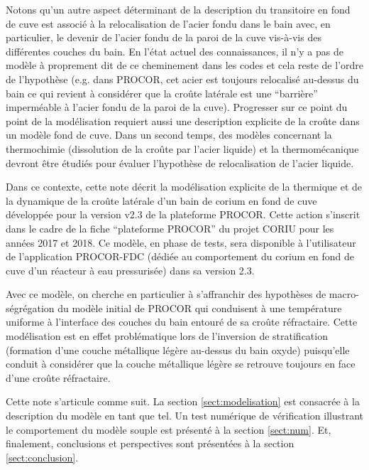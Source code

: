 \begin{remark}
Notons qu'un autre aspect déterminant de la description du transitoire en fond de cuve est associé à la relocalisation de l'acier fondu dans le bain avec, en particulier, le devenir de l'acier fondu de la paroi de la cuve vis-à-vis des différentes couches du bain. En l'état actuel des connaissances, il n'y a pas de modèle à proprement dit de ce cheminement dans les codes et cela reste de l'ordre de l'hypothèse (e.g. dans PROCOR, cet acier est toujours relocalisé au-dessus du bain ce qui revient à considérer que la croûte latérale est une ``barrière'' imperméable à l'acier fondu de la paroi de la cuve). Progresser sur ce point du point de la modélisation requiert aussi une description explicite de la croûte dans un modèle fond de cuve. Dans un second temps, des modèles concernant la thermochimie (dissolution de la croûte par l'acier liquide) et la thermomécanique devront être étudiés pour évaluer l'hypothèse de relocalisation de l'acier liquide.
\end{remark}
Dans ce contexte, cette note décrit la modélisation explicite de la thermique et de la dynamique de la croûte latérale d'un bain de corium en fond de cuve développée pour la version v2.3 de la plateforme PROCOR. Cette action s'inscrit dans le cadre de la fiche ``plateforme PROCOR'' du projet CORIU pour les années 2017 et 2018. Ce modèle, en phase de tests, sera disponible à l'utilisateur de l'application PROCOR-FDC (dédiée au comportement du corium en fond de cuve d'un réacteur à eau pressurisée) dans sa version 2.3.

Avec ce modèle, on cherche en particulier à s'affranchir des hypothèses de macro-ségrégation du modèle initial de PROCOR qui conduisent à une température uniforme à l'interface des couches du bain entouré de sa croûte réfractaire. Cette modélisation est en effet problématique lors de l'inversion de stratification (formation d'une couche métallique légère au-dessus du bain oxyde) puisqu'elle conduit à considérer que la couche métallique légère se retrouve toujours en face d'une croûte réfractaire.

Cette note s'articule comme suit. La section \ref{sect:modelisation} est consacrée à la description du modèle en tant que tel. Un test numérique de vérification illustrant le comportement du modèle souple est présenté à la section \ref{sect:num}. Et, finalement, conclusions et perspectives sont présentées à la section \ref{sect:conclusion}.
